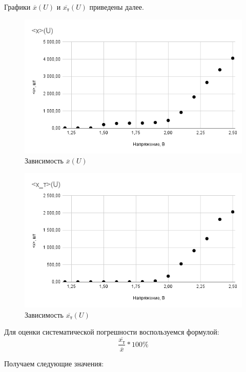 \documentclass[a4paper,12pt]{article}
\begin{document}
\clearpage  
Графики $\overline{x}(U)$ и $\overline{x_т}(U)$ приведены далее.
\begin{figure}[ht!]
    \centering
    \includegraphics[scale=0.7]{xu.png}
    \caption{Зависимость $\overline{x}(U)$}
\end{figure}

\begin{figure}[ht!]
    \centering
    \includegraphics[scale=0.7]{xtu.png}
    \caption{Зависимость $\overline{x_т}(U)$}
\end{figure}

\clearpage
Для оценки систематической погрешности воспользуемся формулой:
\begin{equation}
    \frac{\overline{x_т}}{\overline{x}} * 100\%
\end{equation}

Получаем следующие значения:
\end{document}
